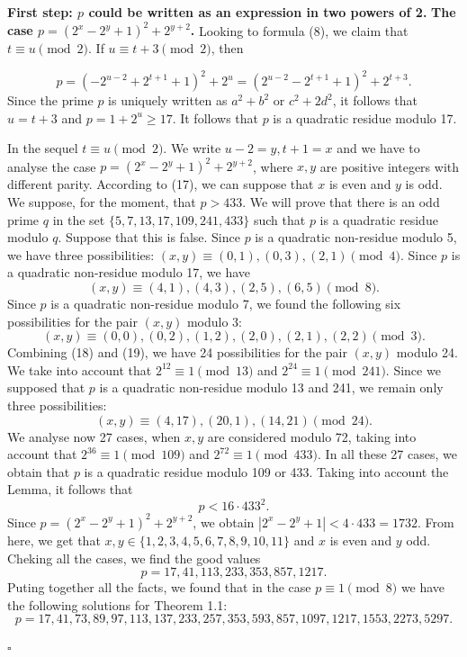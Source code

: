 \documentclass[12pt]{article}
\newenvironment{proof}{{\it Proof.}}{\hfill $ \square $ \vskip 4mm}
\begin{document}
{\begin{proof} {\bf First step: $p$ could be written as an expression in two powers of 2.}
{\bf The case $p=(2^{x}-2^y+1)^2+2^{y+2}$.} Looking to formula (8), we claim that $t\equiv u \pmod 2$. If $u\equiv t+3\pmod 2$, then

\begin{equation}
p=(-2^{u-2}+2^{t+1}+1)^2+2^u=(2^{u-2}-2^{t+1}+1)^2+2^{t+3}.
\end{equation}
Since the prime $p$ is uniquely written as $a^2+b^2$ or $c^2+2d^2$, it follows that $u=t+3$ and $p=1+2^u\geq 17$. It follows that $p$ is a quadratic residue modulo 17. 

In the sequel $t\equiv u \pmod 2$. We write $u-2=y,t+1=x$ and we have to analyse the case $p=(2^{x}-2^y+1)^2+2^{y+2}$, where $x,y$ are positive integers with different parity. According to (17), we can suppose that $x$ is even and $y$ is odd.
We suppose, for the moment, that $p>433$. We will prove that there is an odd prime $q$ in the set $\{5,7,13,17,109,241,433\}$ such that $p$ is a quadratic residue modulo $q$. Suppose that this is false. Since $p$ is a quadratic non-residue modulo 5, we have three possibilities: $(x,y)\equiv (0,1), (0,3), (2,1)\pmod 4$. Since $p$ is a quadratic non-residue modulo 17, we have 
\begin{equation}
(x,y)\equiv (4,1), (4,3),(2,5),(6,5)\pmod 8.
\end{equation}
Since $p$ is a quadratic non-residue modulo 7, we found the following six possibilities for the pair $(x,y)$ modulo 3:
\begin{equation}
(x,y)\equiv (0,0), (0,2),(1,2),(2,0),(2,1),(2,2) \pmod 3.
\end{equation}
Combining (18) and (19), we have 24 possibilities for the pair $(x,y)$ modulo 24. We take into account that $2^{12}\equiv 1 \pmod {13}$ and $2^{24}\equiv 1 \pmod {241}$. Since we supposed that $p$ is a quadratic non-residue modulo 13 and 241, we remain only three possibilities:
\begin{equation}
(x,y)\equiv (4,17), (20,1),(14,21) \pmod {24}.
\end{equation}
 We analyse now 27 cases, when $x,y$ are considered modulo 72, taking into account that $2^{36}\equiv 1 \pmod {109}$ and $2^{72}\equiv 1 \pmod {433}$. In all these 27 cases, we obtain that $p$ is a quadratic residue modulo 109 or 433. Taking into account the Lemma, it follows that 
$$p<16\cdot 433^2.$$ Since $p=(2^{x}-2^y+1)^2+2^{y+2}$, we obtain $|2^{x}-2^y+1|<4\cdot 433=1732.$ From here, we get that $x,y\in \{1,2,3,4,5,6,7,8,9,10,11\}$ and $x$ is even and $y$ odd. Cheking all the cases, we find the good values 
$$p=17,41,113,233,353,857,1217.$$
Puting together all the facts, we found that in the case $p\equiv 1 \pmod 8$ we have the following solutions for Theorem 1.1:
$$p=17,41,73,89,97,113,137,233,257,353,593,857,1097,1217,1553,2273,5297.$$


\end{proof}}
\end{document}
